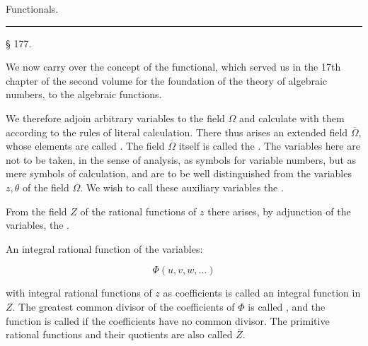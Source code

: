 \begin{center}

Functionals.

\rule{4cm}{0.4pt}
\end{center}

\begin{center}
§ 177. 
\end{center}

We now carry over the concept of the functional, which served us in
the 17th chapter of the second volume for the foundation of the theory
of algebraic numbers, to the algebraic functions.

We therefore adjoin arbitrary variables to the field $\Omega$ and
calculate with them according to the rules of literal calculation. There
thus arises an extended field $\overline{\Omega}$, whose elements are called .
 The field $\overline{\Omega}$ itself is called the .
 The variables here are not to be taken, in the sense of analysis,
as symbols for variable numbers, but as mere symbols of calculation,
and are to be well distinguished from the
variables $z, \theta$ of the field $\Omega$. We wish to call these auxiliary variables
the .

From the field $Z$ of the rational functions of $z$ there arises,
by adjunction of the variables, the .

An integral rational function of the variables:

\[
\Phi(u, v, w, \ldots)
\]

with integral rational functions of $z$ as coefficients is called
an integral function in $Z$. The greatest common divisor
of the coefficients of $\Phi$ is called , and
the function is called  if the coefficients have no common
 divisor. The primitive rational functions
 and their quotients are also called 
$\overline{Z}$.
